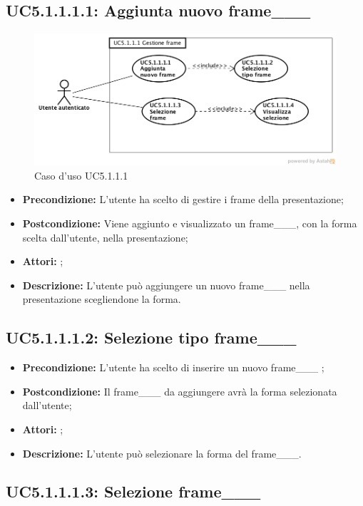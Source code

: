 \subsection{ UC5.1.1.1.1: Aggiunta nuovo frame___}

\begin{figure}[h]
	\begin{center}
	\includegraphics[scale=0.4]{diagram/UC5-1-1-1.png}
	\caption{Caso d'uso UC5.1.1.1}
	\end{center}
\end{figure}
\begin{itemize}
	\item \textbf{Precondizione:} L'utente ha scelto di gestire i frame della presentazione;
	\item \textbf{Postcondizione:} Viene aggiunto e visualizzato un frame___, con la forma scelta dall'utente, nella presentazione;
	\item \textbf{Attori:} ;
	\item \textbf{Descrizione:} L'utente può aggiungere un nuovo frame___ nella presentazione scegliendone la forma.
\end{itemize}
\subsection{ UC5.1.1.1.2: Selezione tipo frame___ }

\begin{itemize}
	\item \textbf{Precondizione:} L'utente ha scelto di inserire un nuovo frame___ ;
	\item \textbf{Postcondizione:} Il frame___ da aggiungere avrà la forma selezionata dall'utente;
	\item \textbf{Attori:} ;
	\item \textbf{Descrizione:} L'utente può selezionare la forma del frame___.
\end{itemize}
\subsection{ UC5.1.1.1.3: Selezione frame___}

